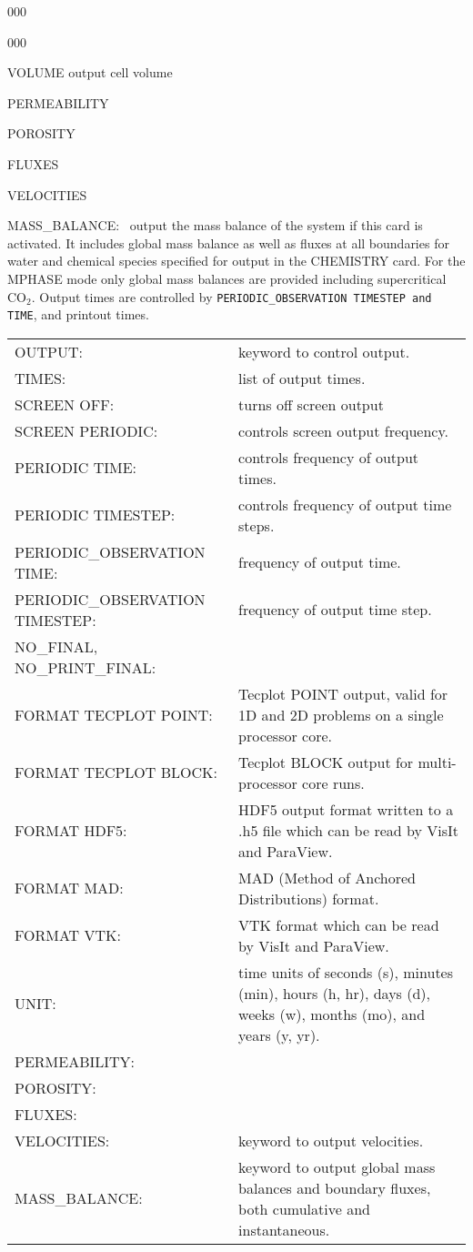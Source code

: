 \begin{deflist}{000}
\begin{deflist}{000}
\item[VOLUME] output cell volume
\item[PERMEABILITY]
\item[POROSITY]
\item[FLUXES]
\item[VELOCITIES]
\item[MASS\_BALANCE:] \ output the mass balance of the system if this card is activated. It includes global mass balance as well as fluxes at all boundaries for water and chemical species specified for output in the CHEMISTRY card. For the MPHASE mode only global mass balances are provided including supercritical CO$_2$. Output times are controlled by {\tt PERIODIC\_OBSERVATION TIMESTEP and TIME}, and printout times.
\end{deflist}
\item[\keyend]
\end{deflist}


\begin{center}
\begin{tabularx}{\linewidth}{lX}
OUTPUT: & keyword to control output.\\
TIMES: & list of output times.\\
SCREEN OFF: & turns off screen output\\
SCREEN PERIODIC: & controls screen output frequency.\\
PERIODIC TIME: & controls frequency of output times.\\
PERIODIC TIMESTEP: & controls frequency of output time steps.\\
PERIODIC\_OBSERVATION TIME: & frequency of output time.\\
PERIODIC\_OBSERVATION TIMESTEP: & frequency of output time step.\\
NO\_FINAL, NO\_PRINT\_FINAL: & \\
FORMAT TECPLOT POINT: & Tecplot POINT output, valid for 1D and 2D problems on a single processor core.\\
FORMAT TECPLOT BLOCK: & Tecplot BLOCK output for multi-processor core runs.\\
FORMAT HDF5: & HDF5 output format written to a .h5 file which can be read by VisIt and ParaView.\\
FORMAT MAD: & MAD (Method of Anchored Distributions) format.\\
FORMAT VTK: & VTK format which can be read by VisIt and ParaView.\\
UNIT: & time units of seconds (s), minutes (min), hours (h, hr), days (d), weeks (w), months (mo), and years (y, yr).\\
PERMEABILITY: & \\
POROSITY: & \\
FLUXES: & \\
VELOCITIES: & keyword to output velocities.\\
MASS\_BALANCE: & keyword to output global mass balances and boundary fluxes, both cumulative and instantaneous.
\end{tabularx}
\end{center}

